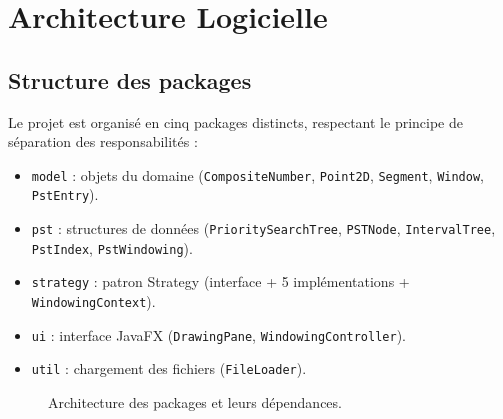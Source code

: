\documentclass[11pt,a4paper]{article}
\begin{document}
\section{Architecture Logicielle}

\subsection{Structure des packages}

Le projet est organisé en cinq packages distincts, respectant le principe de séparation des responsabilités :

\begin{itemize}
    \item \texttt{model} : objets du domaine (\texttt{CompositeNumber}, \texttt{Point2D}, \texttt{Segment}, \texttt{Window}, \texttt{PstEntry}).
    \item \texttt{pst} : structures de données (\texttt{PrioritySearchTree}, \texttt{PSTNode}, \texttt{IntervalTree}, \texttt{PstIndex}, \texttt{PstWindowing}).
    \item \texttt{strategy} : patron Strategy (interface + 5 implémentations + \texttt{WindowingContext}).
    \item \texttt{ui} : interface JavaFX (\texttt{DrawingPane}, \texttt{WindowingController}).
    \item \texttt{util} : chargement des fichiers (\texttt{FileLoader}).
\end{itemize}

\begin{figure}[h]
\centering
{}
\caption{Architecture des packages et leurs dépendances.}
\label{fig:arch}
\end{figure}
\end{document}

